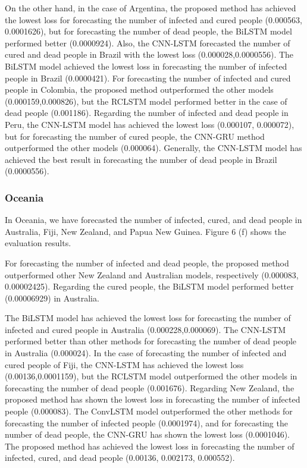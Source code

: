 \documentclass{article}
\begin{document}
On the other hand, in the case of Argentina, the proposed method has achieved the lowest loss for forecasting the number of infected and cured people (0.000563, 0.0001626), but for forecasting the number of dead people, the BiLSTM model performed better (0.0000924). Also, the CNN-LSTM forecasted the number of cured and dead people in Brazil with the lowest loss (0.000028,0.0000556). The BiLSTM model achieved the lowest loss in forecasting the number of infected people in Brazil (0.0000421). For forecasting the number of infected and cured people in Colombia, the proposed method outperformed the other models (0.000159,0.000826), but the RCLSTM model performed better in the case of dead people (0.001186). Regarding the number of infected and dead people in Peru, the CNN-LSTM model has achieved the lowest loss (0.000107, 0.000072), but for forecasting the number of cured people, the CNN-GRU method outperformed the other models (0.000064). Generally, the CNN-LSTM model has achieved the best result in forecasting the number of dead people in Brazil (0.0000556).

\subsubsection{Oceania}
In Oceania, we have forecasted the number of infected, cured, and dead people in Australia, Fiji, New Zealand, and Papua New Guinea. Figure 6 (f) shows the evaluation results. 

For forecasting the number of infected and dead people, the proposed method outperformed other New Zealand and Australian models, respectively (0.000083, 0.00002425). Regarding the cured people, the BiLSTM model performed better (0.00006929) in Australia.

The BiLSTM model has achieved the lowest loss for forecasting the number of infected and cured people in Australia (0.000228,0.000069). The CNN-LSTM performed better than other methods for forecasting the number of dead people in Australia (0.000024). In the case of forecasting the number of infected and cured people of Fiji, the CNN-LSTM has achieved the lowest loss (0.00136,0.0001159), but the RCLSTM model outperformed the other models in forecasting the number of dead people (0.001676). Regarding New Zealand, the proposed method has shown the lowest loss in forecasting the number of infected people (0.000083). The ConvLSTM model outperformed the other methods for forecasting the number of infected people (0.0001974), and for forecasting the number of dead people, the CNN-GRU has shown the lowest loss (0.0001046). The proposed method has achieved the lowest loss in forecasting the number of infected, cured, and dead people (0.00136, 0.002173, 0.000552).
\end{document}
